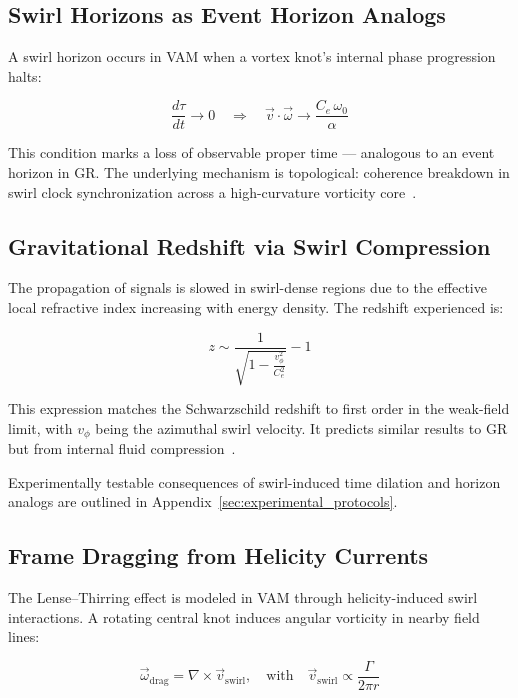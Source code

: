 \documentclass[12pt]{article}
\begin{document}
    \subsection{Swirl Horizons as Event Horizon Analogs}
    A swirl horizon occurs in VAM when a vortex knot’s internal phase progression halts:

    \[
    \frac{d\tau}{dt} \rightarrow 0 \quad \Rightarrow \quad \vec{v} \cdot \vec{\omega} \rightarrow \frac{C_e \, \omega_0}{\alpha}
    \]

    This condition marks a loss of observable proper time — analogous to an event horizon in GR. The underlying mechanism is topological: coherence breakdown in swirl clock synchronization across a high-curvature vorticity core~\cite{ranada1992knots}.

    \subsection{Gravitational Redshift via Swirl Compression}
    The propagation of signals is slowed in swirl-dense regions due to the effective local refractive index increasing with energy density. The redshift experienced is:

    \begin{equation}
    z \sim \frac{1}{\sqrt{1 - \frac{v_\phi^2}{C_e^2}}} - 1
    \end{equation}

    This expression matches the Schwarzschild redshift to first order in the weak-field limit, with \( v_\phi \) being the azimuthal swirl velocity. It predicts similar results to GR but from internal fluid compression~\cite{volovik2003universe, kleckner2013creation}.

    Experimentally testable consequences of swirl-induced time dilation and horizon analogs are outlined in Appendix~\ref{sec:experimental_protocols}.

    \subsection{Frame Dragging from Helicity Currents}
    The Lense--Thirring effect is modeled in VAM through helicity-induced swirl interactions. A rotating central knot induces angular vorticity in nearby field lines:

    \begin{equation}
        \vec{\omega}_{\text{drag}} = \nabla \times \vec{v}_{\text{swirl}}, \quad \text{with} \quad \vec{v}_{\text{swirl}} \propto \frac{\Gamma}{2\pi r}
    \end{equation}
\end{document}
